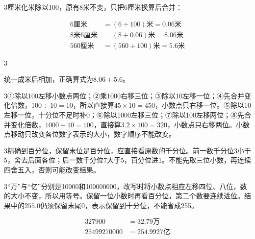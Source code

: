 \documentclass[multi=snippet,border={5bp 20bp 5bp 5bp}]{standalone}
\newenvironment{snippet}[3]{\begin{minipage}{#1bp}\color{answerred}\fontsize{#2}{#3}\selectfont\raggedright}{\end{minipage}}
\begin{document}
\begin{snippet}{505}{11.5}{14}\begin{multicols}{3}\raggedcolumns 厘米化米除以100，原有8米不变，只把6厘米换算后合并：\par\noindent\end{multicols}\[\displaystyle \begin{aligned}6\text{厘米}&=(6\div100)\text{米}=0.06\text{米}\\8\text{米}6\text{厘米}&=(8+0.06)\text{米}=8.06\text{米}\\560\text{厘米}&=(560\div100)\text{米}=5.6\text{米}\end{aligned}\]\begin{multicols}{3}\raggedcolumns \par 统一成米后相加，正确算式为\(8.06+5.6\)\allowbreak 。\end{multicols}\end{snippet}
\begin{snippet}{505}{11.5}{14}\begin{multicols}{3}\raggedcolumns ①除以100左移小数点两位；②乘1000右移三位；③除以10左移一位；④先合并变化倍数，\(100\div10=10\)\allowbreak ，所以直接算\(45\times10=450\)\allowbreak ，小数点只右移一位。⑤除以10左移一位，十分位不足时补0；⑥除以1000左移三位；⑦除以100左移两位；⑧先合并变化倍数，\(1000\div10=100\)\allowbreak ，直接算\(3.2\times100=320\)\allowbreak ，小数点只右移两位。小数点移动只改变各位数字表示的大小，数字顺序不能改变。\end{multicols}\end{snippet}
\begin{snippet}{505}{11.5}{14}\begin{multicols}{3}\raggedcolumns 精确到百分位，保留末位是百分位，应直接看原数的千分位。前一数千分位3小于5，舍去后面各位；后一数千分位7大于5，百分位进1。不能先取三位小数，再连续四舍五入，否则可能改变结果。\end{multicols}\end{snippet}
\begin{snippet}{505}{11.5}{14}\begin{multicols}{3}\raggedcolumns “万”与“亿”分别是10000和100000000，改写时将小数点相应左移四位、八位，数的大小不变，所以用等号。保留一位小数时再看百分位，第二个数要连续进位。结果中的\(255.0\)\allowbreak 仍须保留末尾0，表示保留到十分位，不能省成255。\par\noindent\[\displaystyle \begin{aligned}327900&=32.79\text{万}\\25499270000&=254.9927\text{亿}\end{aligned}\]\par\end{multicols}\end{snippet}
\end{document}
